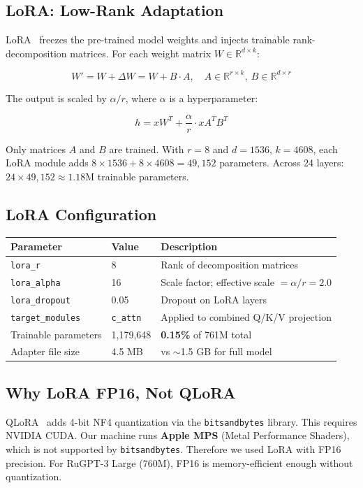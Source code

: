 \documentclass[12pt,a4paper]{article}
\begin{document}
\subsection{LoRA: Low-Rank Adaptation}

LoRA~\cite{hu2022lora} freezes the pre-trained model weights and injects trainable rank-decomposition matrices. For each weight matrix $W \in \mathbb{R}^{d \times k}$:

\[
  W' = W + \Delta W = W + B \cdot A, \quad A \in \mathbb{R}^{r \times k},\ B \in \mathbb{R}^{d \times r}
\]

The output is scaled by $\alpha / r$, where $\alpha$ is a hyperparameter:

\[
  h = xW^T + \frac{\alpha}{r} \cdot x A^T B^T
\]

Only matrices $A$ and $B$ are trained. With $r = 8$ and $d = 1536$, $k = 4608$, each LoRA module adds $8 \times 1536 + 8 \times 4608 = 49,152$ parameters. Across 24 layers: $24 \times 49,152 \approx 1.18$M trainable parameters.

\subsection{LoRA Configuration}

\begin{center}
\begin{tabular}{llp{7cm}}
\toprule
Parameter & Value & Description \\
\midrule
\texttt{lora\_r} & 8 & Rank of decomposition matrices \\
\texttt{lora\_alpha} & 16 & Scale factor; effective scale $= \alpha/r = 2.0$ \\
\texttt{lora\_dropout} & 0.05 & Dropout on LoRA layers \\
\texttt{target\_modules} & \texttt{c\_attn} & Applied to combined Q/K/V projection \\
Trainable parameters & 1,179,648 & \textbf{0.15\%} of 761M total \\
Adapter file size & 4.5 MB & vs $\sim$1.5 GB for full model \\
\bottomrule
\end{tabular}
\end{center}

\subsection{Why LoRA FP16, Not QLoRA}

QLoRA~\cite{dettmers2023qlora} adds 4-bit NF4 quantization via the \texttt{bitsandbytes} library. This requires NVIDIA CUDA. Our machine runs \textbf{Apple MPS} (Metal Performance Shaders), which is not supported by \texttt{bitsandbytes}. Therefore we used LoRA with FP16 precision. For RuGPT-3 Large (760M), FP16 is memory-efficient enough without quantization.
\end{document}
